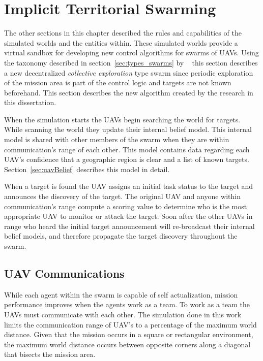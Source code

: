 \section{Implicit Territorial Swarming}
\label{sec:myModel}
The other sections in this chapter described the rules and capabilities of the simulated worlds and the entities within.  These simulated worlds provide a virtual sandbox for developing new control algorithms for swarms of UAVs.  Using the taxonomy described in section~\ref{sec:types_swarms} by ~\textcite{iridia} this section describes a new decentralized \textit{collective exploration} type swarm since periodic exploration of the mission area is part of the control logic and targets are not known beforehand.  This section describes the new algorithm created by the research in this dissertation.

When the simulation starts the UAVs begin searching the world for targets.  While scanning the world they update their internal belief model.  This internal model is shared with other members of the swarm when they are within communication's range of each other.  This model contains data regarding each UAV's confidence that a geographic region is clear and a list of known targets.  Section~\ref{sec:uavBelief} describes this model in detail.

When a target is found the UAV assigns an initial task status to the target and announces the discovery of the target.  The original UAV and anyone within communication's range compute a scoring value to determine who is the most appropriate UAV to monitor or attack the target.  Soon after the other UAVs in range who heard the initial target announcement will re-broadcast their internal belief models, and therefore propagate the target discovery throughout the swarm.

\subsection{UAV Communications}
While each agent within the swarm is capable of self actualization, mission performance improves when the agents work as a team.  To work as a team the UAVs must communicate with each other.  The simulation done in this work limits the communication range of UAV's to a percentage of the maximum world distance.  Given that the mission occurs in a square or rectangular environment, the maximum world distance occurs between opposite corners along a diagonal that bisects the mission area.  %

